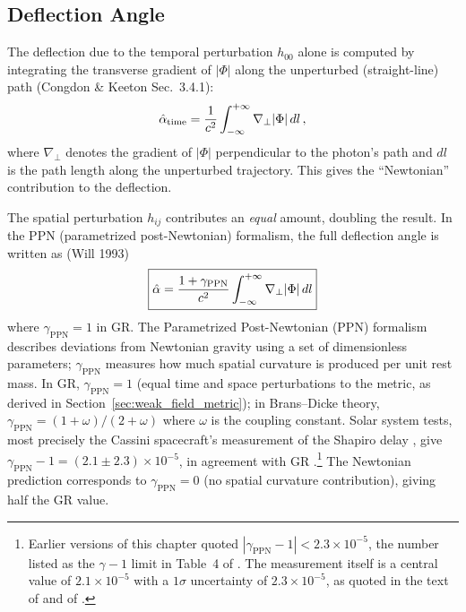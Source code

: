 \subsection{Deflection Angle}

The deflection due to the temporal perturbation $h_{00}$ alone is
computed by integrating the transverse gradient of $|\Phi|$ along the
unperturbed (straight-line) path (Congdon \& Keeton Sec.~3.4.1):
\begin{equation}
    \hat{\alpha}_{\mathrm{time}} = \frac{1}{c^2} \int_{-\infty}^{+\infty}
    \nabla_\perp |\Phi|\, dl \,,
    \label{eq:deflection_integral_half}
\end{equation}
where $\nabla_\perp$ denotes the gradient of $|\Phi|$ perpendicular to
the photon's path and $dl$ is the path length along the unperturbed
trajectory.  This gives the ``Newtonian'' contribution to the
deflection.

The spatial perturbation $h_{ij}$ contributes an \emph{equal} amount,
doubling the result.  In the PPN (parametrized post-Newtonian)
formalism, the full deflection angle is written as
(Will 1993)
\begin{equation}
    \boxed{
    \hat{\alpha} = \frac{1 + \gamma_{\mathrm{PPN}}}{c^2}
    \int_{-\infty}^{+\infty} \nabla_\perp |\Phi|\, dl
    }
    \label{eq:deflection_integral}
\end{equation}
where $\gamma_{\mathrm{PPN}} = 1$ in GR\@.  The Parametrized
Post-Newtonian (PPN) formalism describes deviations from Newtonian
gravity using a set of dimensionless parameters; $\gamma_{\mathrm{PPN}}$
measures how much spatial curvature is produced per unit rest
mass.  In GR, $\gamma_{\mathrm{PPN}} = 1$ (equal time and space
perturbations to the metric, as derived in
Section~\ref{sec:weak_field_metric}); in Brans--Dicke theory,
$\gamma_{\mathrm{PPN}} = (1+\omega)/(2+\omega)$ where $\omega$ is the
coupling constant.  Solar system tests, most precisely the Cassini
spacecraft's measurement of the Shapiro delay \citep{bertotti_2003}, give
$\gamma_{\mathrm{PPN}} - 1 = (2.1 \pm 2.3) \times 10^{-5}$, in
agreement with GR \citep{will_2014}.\footnote{Earlier versions of this chapter quoted
$|\gamma_{\mathrm{PPN}} - 1| < 2.3\times10^{-5}$, the number listed as the
$\gamma - 1$ limit in Table~4 of \citet{will_2014}.  The measurement itself is a
central value of $2.1\times10^{-5}$ with a $1\sigma$ uncertainty of
$2.3\times10^{-5}$, as quoted in the text of \citet{will_2014} and of
\citet{bertotti_2003}.}
The Newtonian prediction corresponds to $\gamma_{\mathrm{PPN}} = 0$
(no spatial curvature contribution), giving half the GR value.

